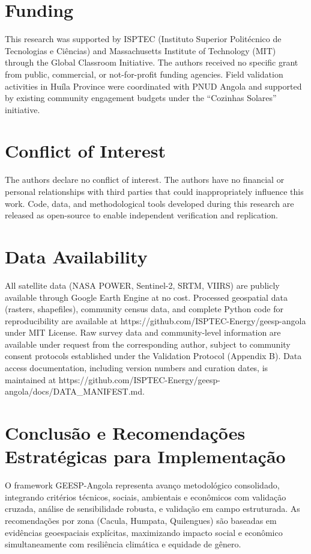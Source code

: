 \documentclass[12pt, a4paper]{article}
\begin{document}
{{{{{{{{{{{{\section*{Funding}
This research was supported by ISPTEC (Instituto Superior Politécnico de Tecnologias e Ciências) and Massachusetts Institute of Technology (MIT) through the Global Classroom Initiative. The authors received no specific grant from public, commercial, or not-for-profit funding agencies. Field validation activities in Huíla Province were coordinated with PNUD Angola and supported by existing community engagement budgets under the ``Cozinhas Solares'' initiative.

\section*{Conflict of Interest}
The authors declare no conflict of interest. The authors have no financial or personal relationships with third parties that could inappropriately influence this work. Code, data, and methodological tools developed during this research are released as open-source to enable independent verification and replication.

\section*{Data Availability}
All satellite data (NASA POWER, Sentinel-2, SRTM, VIIRS) are publicly available through Google Earth Engine at no cost. Processed geospatial data (rasters, shapefiles), community census data, and complete Python code for reproducibility are available at https://github.com/ISPTEC-Energy/geesp-angola under MIT License. Raw survey data and community-level information are available under request from the corresponding author, subject to community consent protocols established under the Validation Protocol (Appendix B). Data access documentation, including version numbers and curation dates, is maintained at https://github.com/ISPTEC-Energy/geesp-angola/docs/DATA\_MANIFEST.md.

\section{Conclusão e Recomendações Estratégicas para Implementação}

O framework GEESP-Angola representa avanço metodológico consolidado, integrando critérios técnicos, sociais, ambientais e econômicos com validação cruzada, análise de sensibilidade robusta, e validação em campo estruturada. As recomendações por zona (Cacula, Humpata, Quilengues) são baseadas em evidências geoespaciais explícitas, maximizando impacto social e econômico simultaneamente com resiliência climática e equidade de gênero.

}}}}}}}}}}}}
\end{document}
